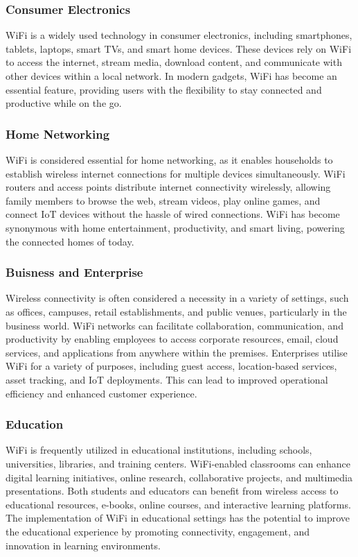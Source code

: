 \subsubsection{Consumer Electronics}
WiFi is a widely used technology in consumer electronics, including smartphones, tablets, laptops, smart TVs, and smart home devices. These devices rely on WiFi to access the internet, stream media, download content, and communicate with other devices within a local network. In modern gadgets, WiFi has become an essential feature, providing users with the flexibility to stay connected and productive while on the go.

\subsubsection{Home Networking}
WiFi is considered essential for home networking, as it enables households to establish wireless internet connections for multiple devices simultaneously. WiFi routers and access points distribute internet connectivity wirelessly, allowing family members to browse the web, stream videos, play online games, and connect IoT devices without the hassle of wired connections. WiFi has become synonymous with home entertainment, productivity, and smart living, powering the connected homes of today.

\subsubsection{Buisness and Enterprise}
Wireless connectivity is often considered a necessity in a variety of settings, such as offices, campuses, retail establishments, and public venues, particularly in the business world. WiFi networks can facilitate collaboration, communication, and productivity by enabling employees to access corporate resources, email, cloud services, and applications from anywhere within the premises. Enterprises utilise WiFi for a variety of purposes, including guest access, location-based services, asset tracking, and IoT deployments. This can lead to improved operational efficiency and enhanced customer experience.

\subsubsection{Education}
WiFi is frequently utilized in educational institutions, including schools, universities, libraries, and training centers. WiFi-enabled classrooms can enhance digital learning initiatives, online research, collaborative projects, and multimedia presentations. Both students and educators can benefit from wireless access to educational resources, e-books, online courses, and interactive learning platforms. The implementation of WiFi in educational settings has the potential to improve the educational experience by promoting connectivity, engagement, and innovation in learning environments.

